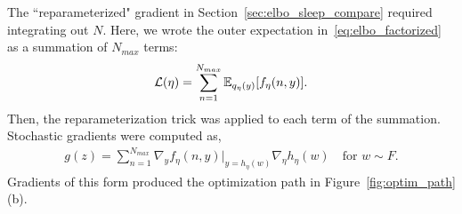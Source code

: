 The ``reparameterized" gradient in Section~\ref{sec:elbo_sleep_compare} required integrating out $N$.
Here, we wrote the outer expectation in~\eqref{eq:elbo_factorized} as a summation of $N_{max}$ terms:
\begin{align}
\mathcal{L}(\eta) = \sum_{n=1}^{N_{max}}\mathbb{E}_{q_\eta(y)}[f_\eta(n, y)].
\end{align}
Then, the reparameterization trick was applied to each term of the summation.
Stochastic gradients were computed as,
\begin{align}
g(z) = \sum_{n=1}^{N_{max}}\nabla_y f_\eta(n, y)\Big|_{y = h_\eta(w)}
\nabla_\eta h_\eta(w) \quad \text{for } w\sim F.
\end{align}
Gradients of this form produced the optimization path in Figure~\ref{fig:optim_path}(b).


